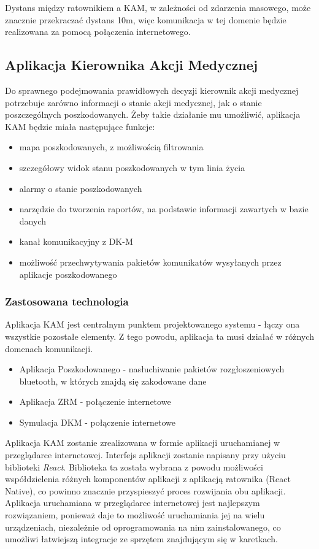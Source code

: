 \documentclass[11pt]{report}
\begin{document}
Dystans między ratownikiem a KAM, w zależności od zdarzenia masowego, może znacznie przekraczać dystans 10m, więc komunikacja w tej domenie będzie realizowana za pomocą połączenia internetowego.

\newpage
\subsection{Aplikacja Kierownika Akcji Medycznej}
Do sprawnego podejmowania prawidłowych decyzji kierownik akcji medycznej potrzebuje zarówno informacji o stanie akcji medycznej, jak o stanie poszczególnych poszkodowanych. Żeby takie działanie mu umożliwić, aplikacja KAM będzie miała następujące funkcje:
\begin{itemize}
    \item mapa poszkodowanych, z możliwością filtrowania
    \item szczegółowy widok stanu poszkodowanych w tym linia życia
    \item alarmy o stanie poszkodowanych
    \item narzędzie do tworzenia raportów, na podstawie informacji zawartych w bazie danych
    \item kanał komunikacyjny z DK-M
    \item możliwość przechwytywania pakietów komunikatów wysyłanych przez aplikacje poszkodowanego
\end{itemize}
\subsubsection{Zastosowana technologia}
Aplikacja KAM jest centralnym punktem projektowanego systemu - łączy ona wszystkie pozostałe elementy. Z tego powodu, aplikacja ta musi działać w różnych domenach komunikacji. 
\begin{itemize}
    \item Aplikacja Poszkodowanego - nasłuchiwanie pakietów rozgłoszeniowych bluetooth, w których znajdą się zakodowane dane
    \item Aplikacja ZRM - połączenie internetowe
    \item Symulacja DKM - połączenie internetowe
\end{itemize}
Aplikacja KAM zostanie zrealizowana w formie aplikacji uruchamianej w przeglądarce internetowej. Interfejs aplikacji zostanie napisany przy użyciu biblioteki \textit{React}. Biblioteka ta została wybrana z powodu możliwości współdzielenia różnych komponentów aplikacji z aplikacją ratownika (React Native), co powinno znacznie przyspieszyć proces rozwijania obu aplikacji.
Aplikacja uruchamiana w przeglądarce internetowej jest najlepszym rozwiązaniem, ponieważ daje to możliwość uruchamiania jej na wielu urządzeniach, niezależnie od oprogramowania na nim zainstalowanego, co umożliwi łatwiejszą integracje ze sprzętem znajdującym się w karetkach\cite{sprzet}.
\newpage
\end{document}
